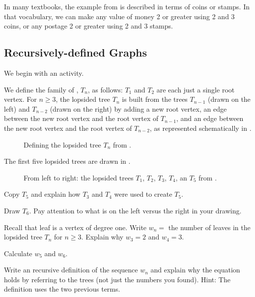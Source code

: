 In many textbooks, the example from  is described in terms of coins or stamps.  In that vocabulary, we can make any value of money 2{\textcent} or greater using 2{\textcent} and 3{\textcent} coins, or any postage 2{\textcent} or greater using 2{\textcent} and 3{\textcent} stamps.


\newcommand{\subrecgraphs}{Recursively-defined Graphs} %
\subsection{\subrecgraphs}
\label{sub_rec_def_graphs}

We begin with an activity.

\begin{act}
\label{act_rec_trees}
    We define the family of , $T_n$, as follows:  $T_1$ and $T_2$ are each just a single root vertex. For $n\ge3$, the lopsided tree $T_n$ is built from the trees $T_{n-1}$ (drawn on the left) and $T_{n-2}$ (drawn on the right) by adding a new root vertex, an edge between the new root vertex and the root vertex of $T_{n-1}$, and an edge between the new root vertex and the root vertex of $T_{n-2}$, as represented schematically in .  
        \begin{figure}[hbtp]
            \centering
            
            \caption{Defining the lopsided tree $T_n$ from .}
            \label{figure_rec_trees_defn}
        \end{figure}
    
    The first five lopsided trees are drawn in .
        \begin{figure}[hbtp]
            \centering
            
            \caption{From left to right: the lopsided trees $T_1$, $T_2$, $T_3$, $T_4$, an $T_5$ from .}
            \label{figure_rec_trees_first_four}
        \end{figure}
        \begin{actpart}
            \item Copy $T_5$ and explain how $T_3$ and $T_4$ were used to create $T_5$.
            \item Draw $T_6$.  Pay attention to what is on the left versus the right in your drawing. 
            \item Recall that leaf is a vertex of degree one.  Write $w_n=$ the number of leaves in the lopsided tree $T_n$ for $n \ge 3$.  Explain why $w_3=2$ and $w_4=3$.
            \item Calculate $w_5$ and $w_6$.
            \item \label{part_rec_trees_leaves} Write an recursive definition of the sequence $w_n$  and explain why the equation holds by referring to the trees (not just the numbers you found).  Hint: The definition uses the two previous terms.
        \end{actpart}
\end{act}

